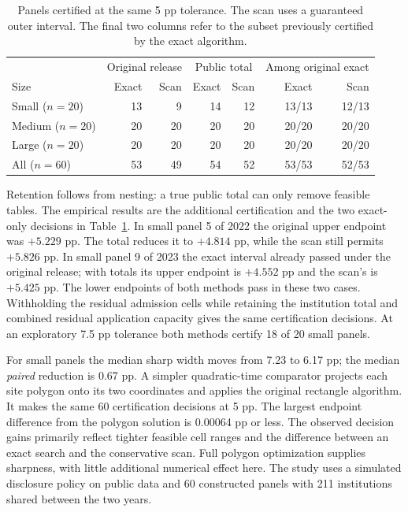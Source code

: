 \documentclass[11pt]{article}
\begin{document}
\begin{table}[ht]
\centering
\caption{Panels certified at the same 5 pp tolerance. The scan uses a guaranteed outer interval. The final two columns refer to the subset previously certified by the exact algorithm.}
\label{tab:totals}
\begin{tabular}{lrrrrrr}
\toprule
&\multicolumn{2}{c}{Original release}&\multicolumn{2}{c}{Public total}&\multicolumn{2}{c}{Among original exact}\\
Size & Exact & Scan & Exact & Scan & Exact & Scan\\
\midrule
Small ($n=20$)  &13&9 &14&12&13/13&12/13\\
Medium ($n=20$) &20&20&20&20&20/20&20/20\\
Large ($n=20$)  &20&20&20&20&20/20&20/20\\
All ($n=60$)    &53&49&54&52&53/53&52/53\\
\bottomrule
\end{tabular}
\end{table}

Retention follows from nesting: a true public total can only remove feasible tables. The empirical results are the additional certification and the two exact-only decisions in Table~\ref{tab:totals}. In small panel 5 of 2022 the original upper endpoint was $+5.229$ pp. The total reduces it to $+4.814$ pp, while the scan still permits $+5.826$ pp. In small panel 9 of 2023 the exact interval already passed under the original release; with totals its upper endpoint is $+4.552$ pp and the scan's is $+5.425$ pp. The lower endpoints of both methods pass in these two cases. Withholding the residual admission cells while retaining the institution total and combined residual application capacity gives the same certification decisions. At an exploratory 7.5 pp tolerance both methods certify 18 of 20 small panels.

For small panels the median sharp width moves from 7.23 to 6.17 pp; the median \emph{paired} reduction is 0.67 pp. A simpler quadratic-time comparator projects each site polygon onto its two coordinates and applies the original rectangle algorithm. It makes the same 60 certification decisions at 5 pp. The largest endpoint difference from the polygon solution is 0.00064 pp or less. The observed decision gains primarily reflect tighter feasible cell ranges and the difference between an exact search and the conservative scan. Full polygon optimization supplies sharpness, with little additional numerical effect here. The study uses a simulated disclosure policy on public data and 60 constructed panels with 211 institutions shared between the two years.
\end{document}
